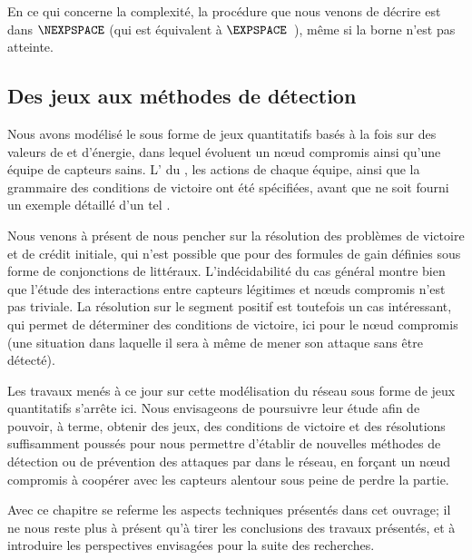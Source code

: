 En ce qui concerne la complexité, la procédure que nous venons de décrire est dans $\NEXPSPACE$ (qui est équivalent à $\EXPSPACE$~\cite[Chap.~20]{papadimitriou94}), même si la borne n'est pas atteinte.

\subsection{Des jeux aux méthodes de détection}

Nous avons modélisé le \rcsf sous forme de jeux quantitatifs basés à la fois sur des valeurs de  et d'énergie, dans lequel évoluent un nœud compromis ainsi qu'une équipe de capteurs sains.
L' du , les actions de chaque équipe, ainsi que la grammaire des conditions de victoire ont été spécifiées, avant que ne soit fourni un exemple détaillé d'un tel .

Nous venons à présent de nous pencher sur la résolution des problèmes de victoire et de crédit initiale, qui n'est possible que pour des formules de gain définies sous forme de conjonctions de littéraux.
L'indécidabilité du cas général montre bien que l'étude des interactions entre capteurs légitimes et nœuds compromis n'est pas triviale.
La résolution sur le segment positif est toutefois un cas intéressant, qui permet de déterminer des conditions de victoire, ici pour le nœud compromis (\cad une situation dans laquelle il sera à même de mener son attaque sans être détecté).

Les travaux menés à ce jour sur cette modélisation du réseau sous forme de jeux quantitatifs s'arrête ici.
Nous envisageons de poursuivre leur étude afin de pouvoir, à terme, obtenir des jeux, des conditions de victoire et des résolutions suffisamment poussés pour nous permettre d'établir de nouvelles méthodes de détection ou de prévention des attaques par \dds dans le réseau, en forçant un nœud compromis à coopérer avec les capteurs alentour sous peine de perdre la partie.

Avec ce chapitre se referme les aspects techniques présentés dans cet ouvrage; il ne nous reste plus à présent qu'à tirer les conclusions des travaux présentés, et à introduire les perspectives envisagées pour la suite des recherches.
